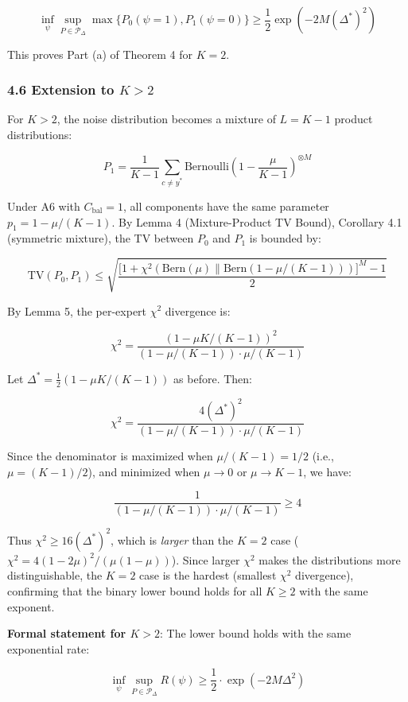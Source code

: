 \documentclass[
  12pt,
]{ctexart}
\begin{document}
\[\inf_{\psi} \sup_{P \in \mathcal{P}_\Delta} \max\{P_0(\psi=1), P_1(\psi=0)\}
\geq \frac{1}{2}\exp(-2M(\Delta^*)^2)\]

This proves Part (a) of Theorem 4 for \(K=2\).

\subsubsection{\texorpdfstring{4.6 Extension to
\(K > 2\)}{4.6 Extension to K \textgreater{} 2}}\label{extension-to-k-2}

For \(K > 2\), the noise distribution becomes a mixture of \(L = K-1\)
product distributions:

\[P_1 = \frac{1}{K-1} \sum_{c \neq y^*} \text{Bernoulli}\!\left(1 - \frac{\mu}{K-1}\right)^{\otimes M}\]

Under A6 with \(C_{\text{bal}} = 1\), all components have the same
parameter \(p_1 = 1 - \mu/(K-1)\). By Lemma 4 (Mixture-Product TV
Bound), Corollary 4.1 (symmetric mixture), the TV between \(P_0\) and
\(P_1\) is bounded by:

\[\text{TV}(P_0, P_1) \leq \sqrt{ \frac{ \bigl[1 + \chi^2(\text{Bern}(\mu) \parallel \text{Bern}(1-\mu/(K-1)))\bigr]^M - 1 }{2} }\]

By Lemma 5, the per-expert \(\chi^2\) divergence is:

\[\chi^2 = \frac{(1 - \mu K/(K-1))^2}{(1 - \mu/(K-1)) \cdot \mu/(K-1)}\]

Let \(\Delta^* = \frac{1}{2}(1 - \mu K/(K-1))\) as before. Then:

\[\chi^2 = \frac{4(\Delta^*)^2}{(1 - \mu/(K-1)) \cdot \mu/(K-1)}\]

Since the denominator is maximized when \(\mu/(K-1) = 1/2\) (i.e.,
\(\mu = (K-1)/2\)), and minimized when \(\mu \to 0\) or \(\mu \to K-1\),
we have:

\[\frac{1}{(1 - \mu/(K-1)) \cdot \mu/(K-1)} \geq 4\]

Thus \(\chi^2 \geq 16(\Delta^*)^2\), which is \emph{larger} than the
\(K=2\) case (\(\chi^2 = 4(1-2\mu)^2/(\mu(1-\mu))\)). Since larger
\(\chi^2\) makes the distributions more distinguishable, the \(K=2\)
case is the hardest (smallest \(\chi^2\) divergence), confirming that
the binary lower bound holds for all \(K \geq 2\) with the same
exponent.

\textbf{Formal statement for \(K > 2\)}: The lower bound holds with the
same exponential rate:

\[\inf_{\psi} \sup_{P \in \mathcal{P}_\Delta} R(\psi) \geq \frac{1}{2} \cdot \exp(-2M\Delta^2)\]
\end{document}
